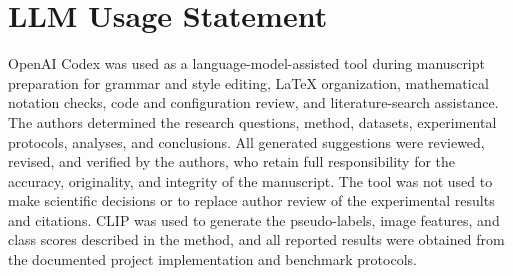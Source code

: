 \documentclass[10pt,twocolumn,letterpaper]{article}
\begin{document}
\section*{LLM Usage Statement}
OpenAI Codex was used as a language-model-assisted tool during manuscript
preparation for grammar and style editing, LaTeX organization, mathematical
notation checks, code and configuration review, and literature-search
assistance. The authors determined the research questions, method, datasets,
experimental protocols, analyses, and conclusions. All generated suggestions
were reviewed, revised, and verified by the authors, who retain full
responsibility for the accuracy, originality, and integrity of the manuscript.
The tool was not used to make scientific decisions or to replace author review
of the experimental results and citations. CLIP was used to generate the
pseudo-labels, image features, and class scores described in the method, and
all reported results were obtained from the documented project implementation
and benchmark protocols.

{
    \small
    
    
}

% 
\end{document}
